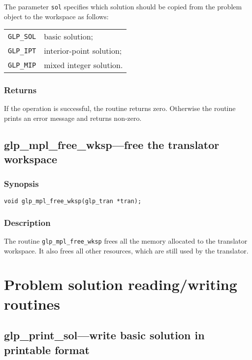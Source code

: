 The parameter \verb|sol| specifies which solution should be copied
from the problem object to the workspace as follows:

\begin{tabular}{@{}ll}
\verb|GLP_SOL| & basic solution; \\
\verb|GLP_IPT| & interior-point solution; \\
\verb|GLP_MIP| & mixed integer solution. \\
\end{tabular}

\subsubsection*{Returns}

If the operation is successful, the routine returns zero. Otherwise
the routine prints an error message and returns non-zero.

\subsection{glp\_mpl\_free\_wksp---free the translator workspace}

\subsubsection*{Synopsis}

\begin{verbatim}
void glp_mpl_free_wksp(glp_tran *tran);
\end{verbatim}

\subsubsection*{Description}

The routine \verb|glp_mpl_free_wksp| frees all the memory allocated to
the translator workspace. It also frees all other resources, which are
still used by the translator.


\newpage

\section{Problem solution reading/writing routines}

\subsection{glp\_print\_sol---write basic solution in printable
format}

